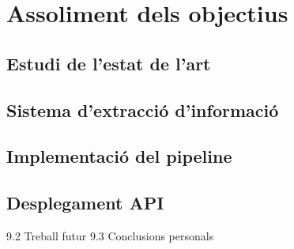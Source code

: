 \section{Assoliment dels objectius}

\subsection{Estudi de l'estat de l'art}
\subsection{Sistema d'extracció d'informació}
\subsection{Implementació del pipeline}
\subsection{Desplegament API}

    9.2 Treball futur
    9.3 Conclusions personals
